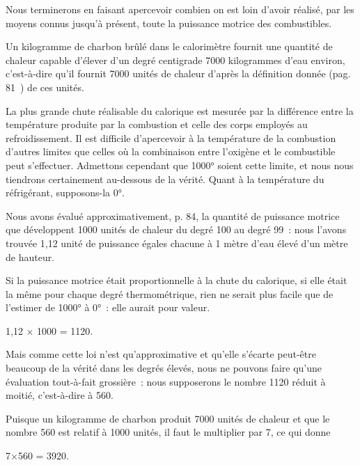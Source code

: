 \documentclass[french,twoside]{book} %
\begin{document}
Nous terminerons en faisant apercevoir combien on est loin d’avoir réalisé, par les moyens connus jusqu’à présent, toute la puissance motrice des combustibles.\par
Un kilogramme de charbon brûlé dans le calorimètre fournit une quantité de chaleur capable d’élever d’un degré centigrade 7000 kilogrammes d’eau environ, c’est-à-dire qu’il fournit 7000 unités de chaleur d’après la définition donnée (pag. 81 ) de ces unités.\par
La plus grande chute réalisable du calorique est mesurée par la différence entre la température produite par la combustion et celle des corps employés au refroidissement. Il est difficile d’apercevoir à la température de la combustion d’autres limites que celles où la combinaison entre l’oxigène et le combustible peut s’effectuer. Admettons cependant que 1000° soient cette limite, et nous nous tiendrons certainement au-dessous de la vérité. Quant à la température du réfrigérant, supposons-la 0°.\par
Nous avons évalué approximativement, p. 84, la quantité de puissance motrice que développent 1000 unités de chaleur du degré 100 au degré 99 : nous l’avons trouvée 1,12 unité de puissance égales chacune à 1 mètre d’eau élevé d’un mètre de hauteur.\par
Si la puissance motrice était proportionnelle à la chute du calorique, si elle était la même pour chaque degré thermométrique, rien ne serait plus facile que de l’estimer de 1000° à 0° : elle aurait pour valeur.\par

\begin{center}
1,12 × 1000 = 1120.\par
\end{center}

\noindent Mais comme cette loi n’est qu’approximative et qu’elle s’écarte peut-être beaucoup de la vérité dans les degrés élevés, nous ne pouvons faire qu’une évaluation tout-à-fait grossière : nous supposerons le nombre 1120 réduit à moitié, c’est-à-dire à 560.\par
Puisque un kilogramme de charbon produit 7000 unités de chaleur et que le nombre 560 est relatif à 1000 unités, il faut le multiplier par 7, ce qui donne\par

\begin{center}
7×560 = 3920.\par
\end{center}
\end{document}
